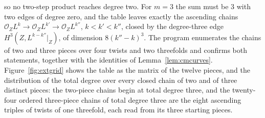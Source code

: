 so no two-step product reaches degree two. For $m=3$ the sum must be $3$ with two edges of degree zero, and the table leaves exactly the ascending chains $\mathcal{O}_{Z}L^{k}\to\mathcal{O}_{Z}L^{k'}\to\mathcal{O}_{Z}L^{k''}$, $k<k'<k''$, closed by the degree-three edge $H^{3}(Z,L^{k-k''}|_{Z})$, of dimension $8(k''-k)^{3}$. The program  enumerates the chains of two and three pieces over four twists and two threefolds and confirms both statements, together with the identities of Lemma~\ref{lem:cmcurves}. Figure~\ref{fig:extgrid} shows the table as the matrix of the twelve pieces, and the distribution of the total degree over every closed chain of two and of three distinct pieces: the two-piece chains begin at total degree three, and the twenty-four ordered three-piece chains of total degree three are the eight ascending triples of twists of one threefold, each read from its three starting pieces.


